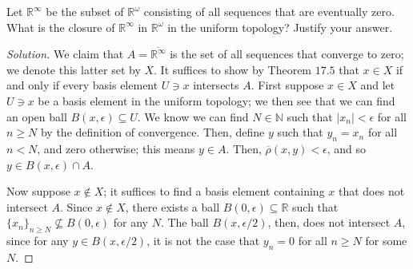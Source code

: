 \documentclass[12pt]{article}
\theoremstyle{remark}
\begin{document}
\begin{problem}
  Let $\mathbb{R}^\infty$ be the subset of $\mathbb{R}^\omega$ consisting of all sequences that are eventually zero. What is the closure of $\mathbb{R}^\infty$ in $\mathbb{R}^\omega$ in the uniform topology? Justify your answer.
\end{problem}
\begin{proof}[Solution]
  We claim that $A = \overline{\mathbb{R}^\infty}$ is the set of all sequences that converge to zero; we denote this latter set by $X$. It suffices to show by Theorem $17.5$ that $x \in X$ if and only if every basis element $U \ni x$ intersects $A$. First suppose $x \in X$ and let $U \ni x$ be a basis element in the uniform topology; we then see that we can find an open ball $B(x,\epsilon) \subseteq U$. We know we can find $N \in \mathbb{N}$ such that $|x_n| < \epsilon$ for all $n \ge N$ by the definition of convergence. Then, define $y$ such that $y_n = x_n$ for all $n < N$, and zero otherwise; this means $y \in A$. Then, $\overline{\rho}(x,y) < \epsilon$, and so $y \in B(x,\epsilon) \cap A$.
  \par Now suppose $x \notin X$; it suffices to find a basis element containing $x$ that does not intersect $A$. Since $x \notin X$, there exists a ball $B(0,\epsilon) \subseteq \mathbb{R}$ such that $\{x_n\}_{n \ge N} \not\subseteq B(0,\epsilon)$ for any $N$. The ball $B(x,\epsilon/2)$, then, does not intersect $A$, since for any $y \in B(x,\epsilon/2)$, it is not the case that $y_n = 0$ for all $n \ge N$ for some $N$.
\end{proof}
\end{document}
